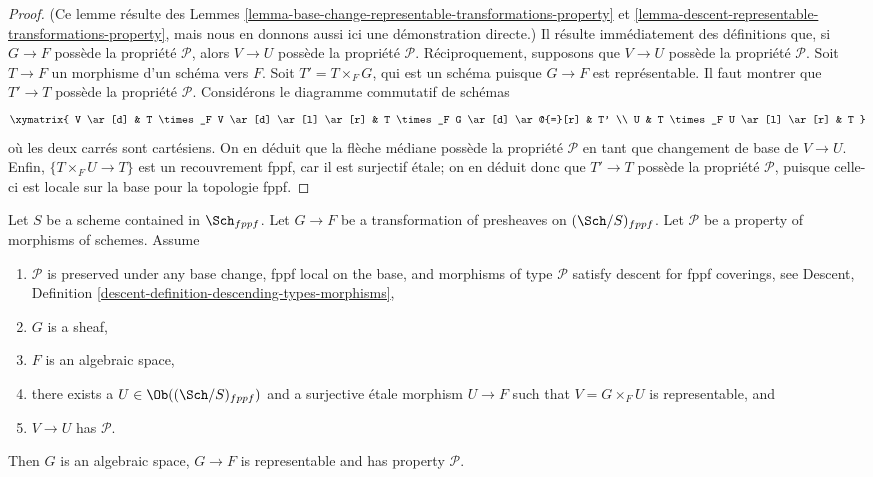 \begin{proof}
(Ce lemme résulte des
Lemmes \ref{lemma-base-change-representable-transformations-property} et
\ref{lemma-descent-representable-transformations-property},
mais nous en donnons aussi ici une démonstration directe.)
Il résulte immédiatement des définitions que, si $G \to F$ possède la propriété
$\mathcal{P}$, alors $V \to U$ possède la propriété $\mathcal{P}$.
Réciproquement, supposons que $V \to U$ possède la propriété $\mathcal{P}$.
Soit $T \to F$ un morphisme d'un schéma vers $F$.
Soit $T' = T \times_F G$, qui est un schéma puisque $G \to F$ est
représentable. Il faut montrer que $T' \to T$ possède la propriété $\mathcal{P}$.
Considérons le diagramme commutatif de schémas
$$
\xymatrix{
V \ar[d] & T \times_F V \ar[d] \ar[l] \ar[r] &
T \times_F G \ar[d] \ar@{=}[r] & T' \\
U & T \times_F U \ar[l] \ar[r] & T
}
$$
où les deux carrés sont cartésiens. On en déduit que
la flèche médiane possède la propriété $\mathcal{P}$ en tant que changement de base
de $V \to U$. Enfin, $\{T \times_F U \to T\}$ est un recouvrement fppf,
car il est surjectif \'etale; on en déduit donc que
$T' \to T$ possède la propriété $\mathcal{P}$, puisque celle-ci est locale sur la
base pour la topologie fppf.
\end{proof}

\begin{lemma}
\label{lemma-morphism-sheaves-with-P-effective-descent-etale}
Let $S$ be a scheme contained in $\Sch_{fppf}$.
Let $G \to F$ be a transformation of presheaves on $(\Sch/S)_{fppf}$.
Let $\mathcal{P}$ be a property of morphisms of schemes.
Assume
\begin{enumerate}
\item $\mathcal{P}$ is preserved under any base change, fppf local on the
base, and morphisms of type $\mathcal{P}$ satisfy descent for fppf coverings,
see Descent, Definition \ref{descent-definition-descending-types-morphisms},
\item $G$ is a sheaf,
\item $F$ is an algebraic space,
\item there exists a $U \in \Ob((\Sch/S)_{fppf})$
and a surjective \'etale morphism $U \to F$ such that
$V = G \times_F U$ is representable, and
\item $V \to U$ has $\mathcal{P}$.
\end{enumerate}
Then $G$ is an algebraic space, $G \to F$ is representable and has property
$\mathcal{P}$.
\end{lemma}

